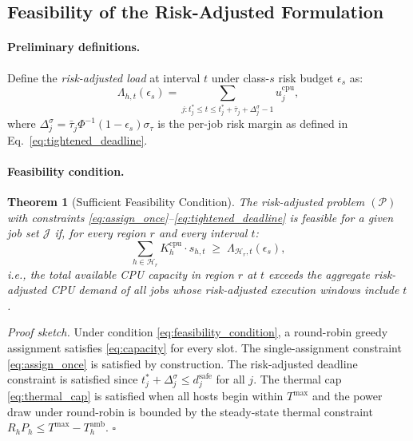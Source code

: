 \documentclass[a4paper,fleqn]{cas-dc}
\begin{document}
\subsection{Feasibility of the Risk-Adjusted Formulation}
\label{sec:feasibility}

\paragraph{Preliminary definitions.}
Define the \emph{risk-adjusted load} at interval $t$ under class-$s$ risk budget $\epsilon_s$ as:
\begin{equation}
\Lambda_{h,t}(\epsilon_s) = \sum_{j: t^*_j \leq t \leq t^*_j + \bar{\tau}_j + \Delta^\sigma_j - 1} u^{\mathrm{cpu}}_j,
\end{equation}
where $\Delta^\sigma_j = \bar{\tau}_j \Phi^{-1}(1-\epsilon_s) \sigma_\tau$ is the per-job risk margin as defined in Eq.~\eqref{eq:tightened_deadline}.

\paragraph{Feasibility condition.}
\smallskip
\noindent\textbf{Theorem 1} (Sufficient Feasibility Condition).
\textit{The risk-adjusted problem $(\mathcal{P})$ with constraints \eqref{eq:assign_once}--\eqref{eq:tightened_deadline} is feasible for a given job set $\mathcal{J}$ if, for every region $r$ and every interval $t$:}
\begin{equation}
\label{eq:feasibility_condition}
\sum_{h \in \mathcal{H}_r} K^{\mathrm{cpu}}_h \cdot s_{h,t} \;\geq\; \Lambda_{\mathcal{H}_r, t}(\epsilon_s),
\end{equation}
\textit{i.e., the total available CPU capacity in region $r$ at $t$ exceeds the aggregate risk-adjusted CPU demand of all jobs whose risk-adjusted execution windows include $t$.}

\smallskip
\noindent\textit{Proof sketch.}
Under condition \eqref{eq:feasibility_condition}, a round-robin greedy assignment satisfies \eqref{eq:capacity} for every slot. The single-assignment constraint \eqref{eq:assign_once} is satisfied by construction. The risk-adjusted deadline constraint is satisfied since $t^*_j + \Delta^\sigma_j \leq d^{\mathrm{safe}}_j$ for all $j$. The thermal cap \eqref{eq:thermal_cap} is satisfied when all hosts begin within $T^{\max}$ and the power draw under round-robin is bounded by the steady-state thermal constraint $R_h P_h \leq T^{\max} - T^{\mathrm{amb}}_h$. \hfill$\square$
\end{document}
